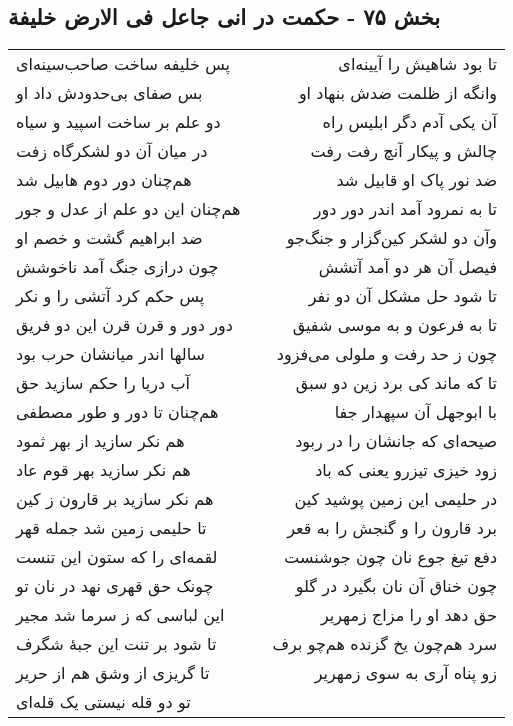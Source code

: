 \begin{center}
\section*{بخش ۷۵ - حکمت در انی جاعل فی الارض خلیفة}
\label{sec:sh075}
\begin{longtable}{l p{0.5cm} r}
پس خلیفه ساخت صاحب‌سینه‌ای
&&
تا بود شاهیش را آیینه‌ای
\\
بس صفای بی‌حدودش داد او
&&
وانگه از ظلمت ضدش بنهاد او
\\
دو علم بر ساخت اسپید و سیاه
&&
آن یکی آدم دگر ابلیس راه
\\
در میان آن دو لشکرگاه زفت
&&
چالش و پیکار آنچ رفت رفت
\\
هم‌چنان دور دوم هابیل شد
&&
ضد نور پاک او قابیل شد
\\
هم‌چنان این دو علم از عدل و جور
&&
تا به نمرود آمد اندر دور دور
\\
ضد ابراهیم گشت و خصم او
&&
وآن دو لشکر کین‌گزار و جنگ‌جو
\\
چون درازی جنگ آمد ناخوشش
&&
فیصل آن هر دو آمد آتشش
\\
پس حکم کرد آتشی را و نکر
&&
تا شود حل مشکل آن دو نفر
\\
دور دور و قرن قرن این دو فریق
&&
تا به فرعون و به موسی شفیق
\\
سالها اندر میانشان حرب بود
&&
چون ز حد رفت و ملولی می‌فزود
\\
آب دریا را حکم سازید حق
&&
تا که ماند کی برد زین دو سبق
\\
هم‌چنان تا دور و طور مصطفی
&&
با ابوجهل آن سپهدار جفا
\\
هم نکر سازید از بهر ثمود
&&
صیحه‌ای که جانشان را در ربود
\\
هم نکر سازید بهر قوم عاد
&&
زود خیزی تیزرو یعنی که باد
\\
هم نکر سازید بر قارون ز کین
&&
در حلیمی این زمین پوشید کین
\\
تا حلیمی زمین شد جمله قهر
&&
برد قارون را و گنجش را به قعر
\\
لقمه‌ای را که ستون این تنست
&&
دفع تیغ جوع نان چون جوشنست
\\
چونک حق قهری نهد در نان تو
&&
چون خناق آن نان بگیرد در گلو
\\
این لباسی که ز سرما شد مجیر
&&
حق دهد او را مزاج زمهریر
\\
تا شود بر تنت این جبهٔ شگرف
&&
سرد هم‌چون یخ گزنده هم‌چو برف
\\
تا گریزی از وشق هم از حریر
&&
زو پناه آری به سوی زمهریر
\\
تو دو قله نیستی یک قله‌ای

\end{longtable}
\end{center}

